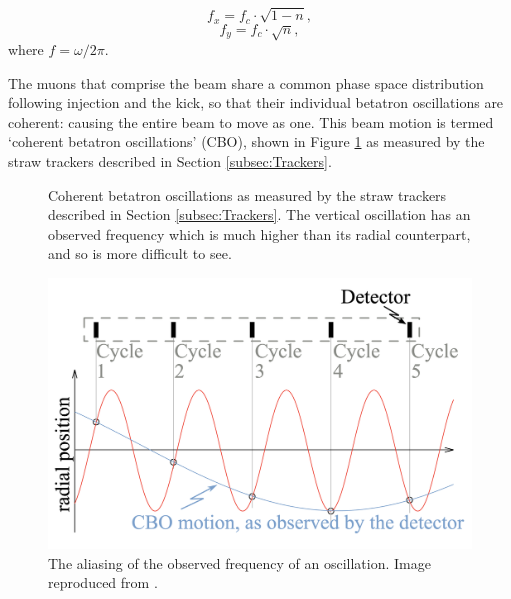 \begin{equation}
  f_{x} = f_{c}\cdot\sqrt{1-n},
  \label{eqn:omegaBOx}
\end{equation}
%
\begin{equation}
  f_{y} = f_{c}\cdot\sqrt{n},
  \label{eqn:omegaBOy}
\end{equation}
%
where $f = \omega/2\pi$. 

The  muons that comprise the beam share a common phase space distribution following injection and the kick, so that their individual betatron oscillations are coherent: causing the entire beam to move as one. This beam motion is termed `coherent betatron oscillations' (CBO), shown in Figure \ref{fig:CBO} as measured by the straw trackers described in Section \ref{subsec:Trackers}. 

\begin{figure}[t!]
\centering{}
\caption{Coherent betatron oscillations as measured by the straw trackers described in Section \ref{subsec:Trackers}. The vertical oscillation has an observed frequency which is much higher than its radial counterpart, and so is more difficult to see.}
\label{fig:CBO}
\end{figure} 
\begin{figure}[t!]
\centering{}
\includegraphics[trim={0 0 0 0},clip,width=.59\textwidth]{Images/Chapter3/CBO_diagram.png}
\caption{The aliasing of the observed frequency of an oscillation. Image reproduced from \cite{KimCBO}.}
\label{fig:Aliasing}
\end{figure} 

